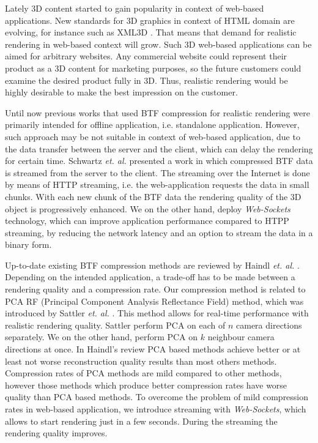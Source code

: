  Lately 3D content started to gain popularity in context of web-based applications.
 New standards for 3D graphics in context of HTML domain are evolving, for instance such as XML3D \cite{xml3d}.
 That means that demand for realistic rendering in web-based context will grow.
 Such 3D web-based applications can be aimed for arbitrary websites.
 Any commercial website could represent their product as a 3D content for marketing purposes, so the future customers could examine the desired product fully in 3D.
 Thus, realistic rendering would be highly desirable to make the best impression on the customer.
 
 Until now previous works that used BTF compression for realistic rendering were primarily intended  for offline application, i.e. standalone application.
However, such approach may be not suitable in context of web-based application, due to the data transfer between the server and the client, which can delay the rendering for certain time.
  Schwartz \emph{et. al.} \cite{webglbtfstreaming} presented a work in which compressed BTF data is streamed from the server to the client.
 The streaming over the Internet is done by means of HTTP streaming, i.e. the web-application requests the data in small chunks.
 With each new chunk of the BTF data the rendering quality of the 3D object is progressively enhanced.
 We on the other hand, deploy \emph{Web-Sockets} technology, which can improve application performance compared to HTPP streaming, by reducing the network latency and an option to stream the data in a binary form.

 
 Up-to-date existing BTF compression methods are reviewed by Haindl \emph{et. al.} \cite{haindl, haindl_visual}.
 Depending on the intended application, a trade-off has to be made between a rendering quality and a compression rate.
Our compression method is related to PCA RF (Principal Component Analysis Reflectance Field) method, which was introduced by Sattler \emph{et. al.} \cite{star2004}.
This method allows for real-time performance with realistic rendering quality. 
Sattler perform PCA on each of $n$ camera directions separately. We on the other hand, perform PCA on $k$ neighbour camera directions at once.
In Haindl's review \cite{haindl} PCA based methods achieve better or at least not worse reconstruction quality results than most others methods.
Compression rates of PCA methods are mild compared to other methods, however those methods which produce better compression rates have worse quality than PCA based methods.
To overcome the problem of mild compression rates in web-based application, we introduce streaming with \emph{Web-Sockets}, which allows to start rendering just in a few seconds.
During the streaming the rendering quality improves.


